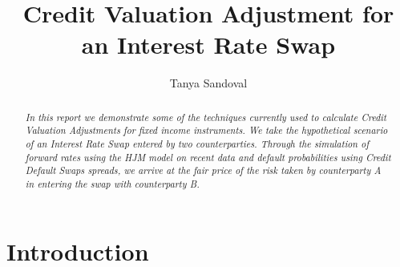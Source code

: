 \documentclass[reqno]{article}
\title{Credit Valuation Adjustment for an Interest Rate Swap}
\author{Tanya Sandoval}
\begin{document}
    \maketitle

    \begin{abstract}
    \emph{
    In this report we demonstrate some of the techniques currently used  to calculate Credit Valuation Adjustments for fixed income instruments. 
    We take the hypothetical scenario of an Interest Rate Swap entered by two counterparties. Through the simulation of forward rates using the HJM model on recent data and default probabilities using Credit Default Swaps spreads, we arrive at the fair price of the risk taken by counterparty A in entering the swap with counterparty B.
     }
    \end{abstract}


    \tableofcontents
    
       \afterpage{\null\newpage}
    \newpage
    



    \section{Introduction}\label{cva-calculation-for-an-interest-rate-swap}
\end{document}
